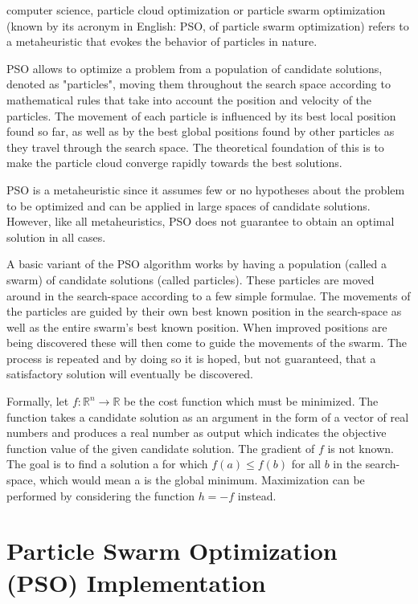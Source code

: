  computer science, particle cloud optimization or particle swarm optimization (known by its acronym in English: PSO, of particle swarm optimization) refers to a metaheuristic that evokes the behavior of particles in nature.

PSO allows to optimize a problem from a population of candidate solutions, denoted as "particles", moving them throughout the search space according to mathematical rules that take into account the position and velocity of the particles. The movement of each particle is influenced by its best local position found so far, as well as by the best global positions found by other particles as they travel through the search space. The theoretical foundation of this is to make the particle cloud converge rapidly towards the best solutions.

PSO is a metaheuristic since it assumes few or no hypotheses about the problem to be optimized and can be applied in large spaces of candidate solutions. However, like all metaheuristics, PSO does not guarantee to obtain an optimal solution in all cases.

A basic variant of the PSO algorithm works by having a population (called a swarm) of candidate solutions (called particles). These particles are moved around in the search-space according to a few simple formulae. The movements of the particles are guided by their own best known position in the search-space as well as the entire swarm's best known position. When improved positions are being discovered these will then come to guide the movements of the swarm. The process is repeated and by doing so it is hoped, but not guaranteed, that a satisfactory solution will eventually be discovered.

Formally, let $f: \mathbb{R}^{n} \to \mathbb{R}$ be the cost function which must be minimized. The function takes a candidate solution as an argument in the form of a vector of real numbers and produces a real number as output which indicates the objective function value of the given candidate solution. The gradient of $f$ is not known. The goal is to find a solution a for which $f(a) \leq f(b)$ for all $b$ in the search-space, which would mean a is the global minimum. Maximization can be performed by considering the function $h = -f$ instead.

\section{Particle Swarm Optimization (PSO) Implementation}

